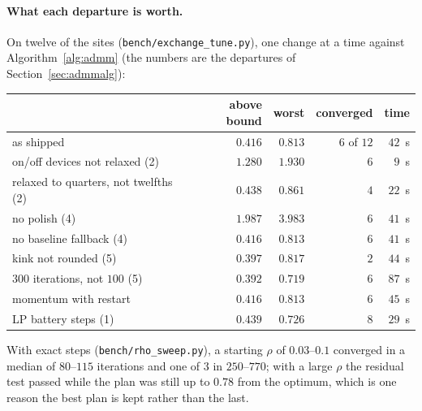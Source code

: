 \documentclass[11pt,a4paper]{article}
\begin{document}
\paragraph{What each departure is worth.} On twelve of the sites
(\texttt{bench/exchange\_tune.py}), one change at a time against
Algorithm~\ref{alg:admm} (the numbers are the departures of
Section~\ref{sec:admmalg}):
\begin{center}
\small
\begin{tabular}{lrrrr}
\toprule
& above bound & worst & converged & time \\
\midrule
as shipped                                  & $0.416$ & $0.813$ & $6$ of $12$ & $42$~s \\
on/off devices not relaxed (2)              & $1.280$ & $1.930$ & $6$ & $9$~s \\
relaxed to quarters, not twelfths (2)       & $0.438$ & $0.861$ & $4$ & $22$~s \\
no polish (4)                               & $1.987$ & $3.983$ & $6$ & $41$~s \\
no baseline fallback (4)                    & $0.416$ & $0.813$ & $6$ & $41$~s \\
kink not rounded (5)                        & $0.397$ & $0.817$ & $2$ & $44$~s \\
$300$ iterations, not $100$ (5)             & $0.392$ & $0.719$ & $6$ & $87$~s \\
momentum with restart \cite{goldstein2014}  & $0.416$ & $0.813$ & $6$ & $45$~s \\
LP battery steps (1)                        & $0.439$ & $0.726$ & $8$ & $29$~s \\
\bottomrule
\end{tabular}
\end{center}
With exact steps (\texttt{bench/rho\_sweep.py}), a starting $\rho$ of $0.03$--$0.1$
converged in a median of $80$--$115$ iterations and one of $3$ in $250$--$770$;
with a large $\rho$ the residual test passed while the plan was still up to $0.78$
from the optimum, which is one reason the best plan is kept rather than the last.
\end{document}
